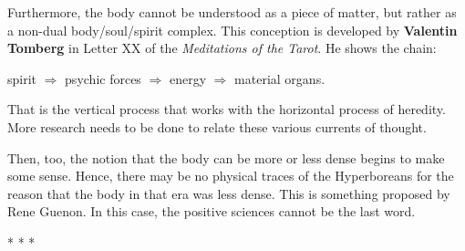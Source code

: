 Furthermore, the body cannot be understood as a piece of matter, but rather as a non-dual body/soul/spirit complex. This conception is developed by \textbf{Valentin Tomberg} in Letter XX of the \textit{Meditations of the Tarot}. He shows the chain:

spirit $\Rightarrow $ psychic forces $\Rightarrow $ energy $\Rightarrow $ material organs.

That is the vertical process that works with the horizontal process of heredity. More research needs to be done to relate these various currents of thought.

Then, too, the notion that the body can be more or less dense begins to make some sense. Hence, there may be no physical traces of the Hyperboreans for the reason that the body in that era was less dense. This is something proposed by Rene Guenon. In this case, the positive sciences cannot be the last word.


\begin{center}* * *\end{center}

